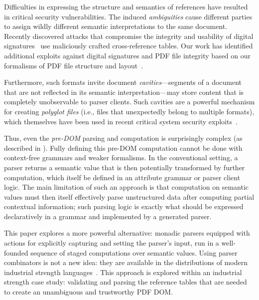 Difficulties in expressing the structure and semantics of references
have resulted in critical security vulnerabilities.
%
The induced \emph{ambiguities} cause different parties
to assign wildly different semantic interpretations to the same
document.
%
Recently discovered attacks that compromise the integrity and
usability of digital
signatures~\cite{rohlmannBreakingSpecificationPDF2021,
  mainkaShadowAttacksHiding2021} use maliciously crafted
cross-reference tables. Our work has identified additional exploits
against digital signatures and PDF file integrity based on our
formalisms of PDF file structure and layout~\cite{cve25641}.

Furthermore, such formats invite document \emph{cavities}---segments
of a document that are not reflected in its semantic
interpretation---may store content that is completely unobservable to
parser clients.
%
Such cavities are a powerful mechanism for creating \emph{polyglot
  files} (i.e., files that unexpectedly belong to multiple formats),
which themselves have been used in recent critical system security
exploits~\cite{psychicPaper}.

Thus, even the \emph{pre-DOM} parsing and computation
is surprisingly complex (as described in ).
Fully defining this pre-DOM computation cannot be done
with context-free grammars and weaker formalisms.
%
In the conventional setting, a parser returns a semantic value that is
then potentially transformed by further computation, which itself be
defined in an attribute grammar or parser client logic.
%
The main limitation of such an approach is that computation on
semantic values must then itself effectively parse unstructured data
after computing partial contextual information;
%
such parsing logic is exactly what should be expressed declaratively
in a grammar and implemented by a generated parser.

This paper explores a more powerful alternative: monadic parsers equipped 
with actions for explicitly capturing and setting the parser's input, run 
in a well-founded sequence of staged computations over semantic values.
%
Using parser combinators is not a new idea: they are available in the
distributions of modern industrial strength
languages~\cite{leijen2001parsec,couprie2015nom,mundkurResearchReportParsley2020,bratus2017curing,willis2020staged}.
%
This approach is explored within an industrial strength case study:
validating and parsing the reference tables that are needed to create 
an unambiguous and trustworthy PDF DOM.

